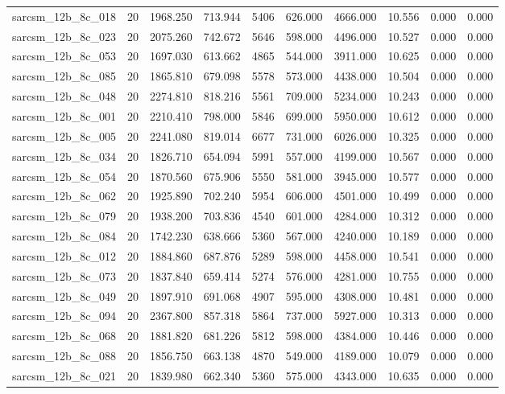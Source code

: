 \begin{tabular}{lrrrrrrrrr}
sarcsm\_12b\_8c\_018 & 20 & 1968.250 & 713.944 & 5406 & 626.000 & 4666.000 & 10.556 & 0.000 & 0.000 \\
sarcsm\_12b\_8c\_023 & 20 & 2075.260 & 742.672 & 5646 & 598.000 & 4496.000 & 10.527 & 0.000 & 0.000 \\
sarcsm\_12b\_8c\_053 & 20 & 1697.030 & 613.662 & 4865 & 544.000 & 3911.000 & 10.625 & 0.000 & 0.000 \\
sarcsm\_12b\_8c\_085 & 20 & 1865.810 & 679.098 & 5578 & 573.000 & 4438.000 & 10.504 & 0.000 & 0.000 \\
sarcsm\_12b\_8c\_048 & 20 & 2274.810 & 818.216 & 5561 & 709.000 & 5234.000 & 10.243 & 0.000 & 0.000 \\
sarcsm\_12b\_8c\_001 & 20 & 2210.410 & 798.000 & 5846 & 699.000 & 5950.000 & 10.612 & 0.000 & 0.000 \\
sarcsm\_12b\_8c\_005 & 20 & 2241.080 & 819.014 & 6677 & 731.000 & 6026.000 & 10.325 & 0.000 & 0.000 \\
sarcsm\_12b\_8c\_034 & 20 & 1826.710 & 654.094 & 5991 & 557.000 & 4199.000 & 10.567 & 0.000 & 0.000 \\
sarcsm\_12b\_8c\_054 & 20 & 1870.560 & 675.906 & 5550 & 581.000 & 3945.000 & 10.577 & 0.000 & 0.000 \\
sarcsm\_12b\_8c\_062 & 20 & 1925.890 & 702.240 & 5954 & 606.000 & 4501.000 & 10.499 & 0.000 & 0.000 \\
sarcsm\_12b\_8c\_079 & 20 & 1938.200 & 703.836 & 4540 & 601.000 & 4284.000 & 10.312 & 0.000 & 0.000 \\
sarcsm\_12b\_8c\_084 & 20 & 1742.230 & 638.666 & 5360 & 567.000 & 4240.000 & 10.189 & 0.000 & 0.000 \\
sarcsm\_12b\_8c\_012 & 20 & 1884.860 & 687.876 & 5289 & 598.000 & 4458.000 & 10.541 & 0.000 & 0.000 \\
sarcsm\_12b\_8c\_073 & 20 & 1837.840 & 659.414 & 5274 & 576.000 & 4281.000 & 10.755 & 0.000 & 0.000 \\
sarcsm\_12b\_8c\_049 & 20 & 1897.910 & 691.068 & 4907 & 595.000 & 4308.000 & 10.481 & 0.000 & 0.000 \\
sarcsm\_12b\_8c\_094 & 20 & 2367.800 & 857.318 & 5864 & 737.000 & 5927.000 & 10.313 & 0.000 & 0.000 \\
sarcsm\_12b\_8c\_068 & 20 & 1881.820 & 681.226 & 5812 & 598.000 & 4384.000 & 10.446 & 0.000 & 0.000 \\
sarcsm\_12b\_8c\_088 & 20 & 1856.750 & 663.138 & 4870 & 549.000 & 4189.000 & 10.079 & 0.000 & 0.000 \\
sarcsm\_12b\_8c\_021 & 20 & 1839.980 & 662.340 & 5360 & 575.000 & 4343.000 & 10.635 & 0.000 & 0.000 \\

\end{tabular}
